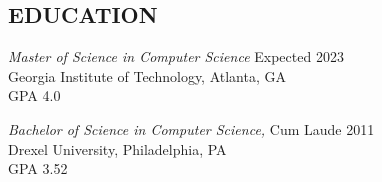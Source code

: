 \documentclass[line]{style}
\begin{document}
\begin{resume}
\section{EDUCATION}
{\sl Master of Science in Computer Science} \hfill Expected 2023 \\
Georgia Institute of Technology, Atlanta, GA \\
GPA 4.0

{\sl Bachelor of Science in Computer Science,} Cum Laude \hfill 2011 \\
Drexel University, Philadelphia, PA \\
GPA 3.52

\end{resume}
\end{document}
